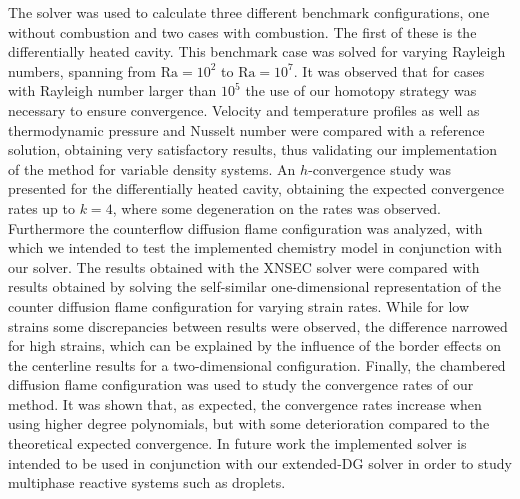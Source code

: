 The solver was used to calculate three different benchmark configurations, one without combustion and two cases with combustion. The first of these is the differentially heated cavity. This benchmark case was solved for varying Rayleigh numbers, spanning from $\text{Ra} = 10^2$ to $\text{Ra} = 10^7$.  It was observed that for cases with Rayleigh number larger than $10^5$ the use of our homotopy strategy was necessary to ensure convergence. Velocity and temperature profiles as well as thermodynamic pressure and Nusselt number were compared with a reference solution, obtaining very satisfactory results, thus validating our implementation of the method for variable density systems. An $h$-convergence study was presented for the differentially heated cavity, obtaining the expected convergence rates up to $k = 4$, where some degeneration on the rates was observed. Furthermore the counterflow diffusion flame configuration was analyzed, with which we intended to test the implemented chemistry model in conjunction with our solver. The results obtained with the XNSEC solver were compared with results obtained by solving the self-similar one-dimensional representation of the counter diffusion flame configuration for varying strain rates. While for low strains some discrepancies between results were observed, the difference narrowed for high strains, which can be explained by the influence of the border effects on the centerline results for a two-dimensional configuration. Finally, the chambered diffusion flame configuration was used to study the convergence rates of our method. It was shown that, as expected, the convergence rates increase when using higher degree polynomials, but with some deterioration compared to the theoretical expected convergence. In future work the implemented solver is intended to be used in conjunction with our extended-DG solver \textcite{kummerExtendedDiscontinuousGalerkin2017,kummerBoSSSPackageMultigrid2021,krauseIncompressibleImmersedBoundary2017}in order to study multiphase reactive systems such as droplets.



